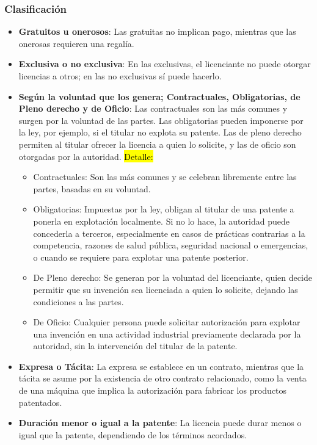 \documentclass{templateNote}
\begin{document}
\subsubsection*{Clasificación}
\begin{itemize}
    \item \textbf{Gratuitos u onerosos}: Las gratuitas no implican pago, mientras que las onerosas requieren una regalía.
    \item \textbf{Exclusiva o no exclusiva}: En las exclusivas, el licenciante no puede otorgar licencias a otros; en las no exclusivas sí puede hacerlo.
    \item \textbf{Según la voluntad que los genera; Contractuales, Obligatorias, de Pleno derecho y de Oficio}: Las contractuales son las más comunes y surgen por la voluntad de las partes. Las obligatorias pueden imponerse por la ley, por ejemplo, si el titular no explota su patente. Las de pleno derecho permiten al titular ofrecer la licencia a quien lo solicite, y las de oficio son otorgadas por la autoridad. \hl{Detalle:}
    \begin{itemize}
        \item Contractuales: Son las más comunes y se celebran libremente entre las partes, basadas en su voluntad.
        \item Obligatorias: Impuestas por la ley, obligan al titular de una patente a ponerla en explotación localmente. Si no lo hace, la autoridad puede concederla a terceros, especialmente en casos de prácticas contrarias a la competencia, razones de salud pública, seguridad nacional o emergencias, o cuando se requiere para explotar una patente posterior.
        \item De Pleno derecho: Se generan por la voluntad del licenciante, quien decide permitir que su invención sea licenciada a quien lo solicite, dejando las condiciones a las partes.
        \item De Oficio: Cualquier persona puede solicitar autorización para explotar una invención en una actividad industrial previamente declarada por la autoridad, sin la intervención del titular de la patente.
    \end{itemize}
    \item \textbf{Expresa o Tácita}: La expresa se establece en un contrato, mientras que la tácita se asume por la existencia de otro contrato relacionado, como la venta de una máquina que implica la autorización para fabricar los productos patentados.
    \item \textbf{Duración menor o igual a la patente}: La licencia puede durar menos o igual que la patente, dependiendo de los términos acordados.
\end{itemize}
\end{document}
